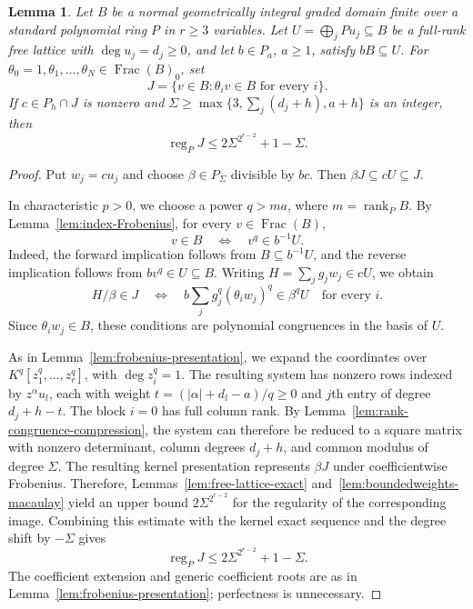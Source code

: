 \documentclass[12pt]{amsart}
\numberwithin{equation}{section}
\newtheorem{lemma}[theorem]{Lemma}
\theoremstyle{definition}
\theoremstyle{remark}
\numberwithin{equation}{section}
\DeclareMathOperator{\reg}{reg}
\DeclareMathOperator{\Frac}{Frac}
\begin{document}
\begin{lemma}\label{lem:fractional-intersection-bound}
	Let $B$ be a normal geometrically integral graded domain finite over
	a standard polynomial ring $P$ in $r\ge3$ variables. Let
	$U=\bigoplus_jPu_j\subseteq B$ be a full-rank free lattice with
	$\deg u_j=d_j\ge0$, and let $b\in P_a$, $a\ge1$, satisfy $bB\subseteq U$.
	For $\theta_0=1,\theta_1,\ldots,\theta_N\in\Frac(B)_0$, set
	\[
	J=\{v\in B:\theta_iv\in B\text{ for every }i\}.
	\]
	If $c\in P_h\cap J$ is nonzero and
	$\Sigma\ge\max\{3,\sum_j(d_j+h),a+h\}$ is an integer, then
	\[
	\reg_PJ\le2\Sigma^{2^{r-2}}+1-\Sigma.
	\]
\end{lemma}
\begin{proof}
	Put $w_j=cu_j$ and choose $\beta\in P_\Sigma$ divisible by $bc$.
	Then $\beta J\subseteq cU\subseteq J$.
	
	In characteristic $p>0$, we  choose a power $q>ma$, where
	$m=\operatorname{rank}_PB$. By
	Lemma~\ref{lem:index-Frobenius}, for every $v\in\Frac(B)$,
	\[
	v\in B\quad\Longleftrightarrow\quad v^q\in b^{-1}U.
	\]
	Indeed, the forward implication follows from $B\subseteq b^{-1}U$, and the reverse implication follows from $bv^q\in U\subseteq B$.
Writing $H=\sum_jg_jw_j\in cU$, we obtain
	\[
	H/\beta\in J\quad\Longleftrightarrow\quad
	b\sum_jg_j^q(\theta_iw_j)^q\in\beta^qU
	\quad\text{for every }i.
	\]
	Since $\theta_iw_j\in B$, these conditions are polynomial congruences in the basis of $U$.
	
	As in Lemma~\ref{lem:frobenius-presentation}, we expand the coordinates over	$K^q[z_1^q,\ldots,z_r^q]$, with
	$\deg z_i^q=1$. The resulting system has nonzero rows indexed by $z^\alpha u_l$, each with weight
	$t=(|\alpha|+d_l-a)/q\ge0$ and $j$th entry of degree $d_j+h-t$. The block $i=0$ has full column rank.
	By Lemma~\ref{lem:rank-congruence-compression},	the system can therefore be reduced to a square
		matrix with nonzero determinant, column degrees $d_j+h$, and common modulus of degree $\Sigma$.
	The resulting kernel presentation represents $\beta J$	under coefficientwise Frobenius. Therefore, Lemmas~\ref{lem:free-lattice-exact} and~\ref{lem:boundedweights-macaulay} yield an upper bound
$2\Sigma^{2^{r-2}}$  for the regularity of the 	corresponding image.
	Combining this estimate with the kernel exact sequence and the degree shift by $-\Sigma$ gives
	\[
	\reg_PJ\le2\Sigma^{2^{r-2}}+1-\Sigma.
	\]
	The coefficient extension and generic coefficient roots are as in Lemma~\ref{lem:frobenius-presentation}; perfectness is unnecessary.
	

\end{proof}
\end{document}
